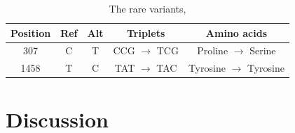\documentclass{article}
\begin{document}
\begin{table}
	\centering
	\begin{tabular}{|c|c|c|c|c|}
		\hline
		Position & Ref  & Alt & Triplets & Amino acids\\
		\hline
		307  & C & T & CCG  $\rightarrow$  TCG &  Proline $\rightarrow$ Serine \\
		\hline
		1458  & T & C & TAT $\rightarrow$   TAC &  Tyrosine $\rightarrow$ Tyrosine  \\
	 
		\hline
	\end{tabular}
	\caption{ The rare variants,  }
	\label{tab:rarevars}
\end{table}

\section{Discussion}

 

\end{document}
